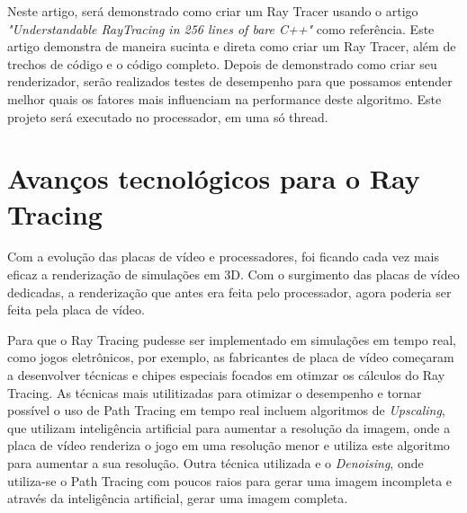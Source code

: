 \documentclass[journal]{IEEEtran}
\begin{document}
Neste artigo, será demonstrado como criar um Ray Tracer usando o artigo 
\emph{"Understandable RayTracing in 256 lines of bare C++"}\cite{c14} como referência.
Este artigo demonstra de maneira sucinta e direta como criar um Ray Tracer,
além de trechos de código e o código completo. Depois de demonstrado como
criar seu renderizador, serão realizados testes de desempenho para que
possamos entender melhor quais os fatores mais influenciam na performance
deste algoritmo. Este projeto será executado no processador, em uma
só thread.

\section{Avanços tecnológicos para o Ray Tracing}
Com a evolução das placas de vídeo e processadores, foi ficando cada vez mais
eficaz a renderização de simulações em 3D. Com o surgimento das placas de vídeo
dedicadas, a renderização que antes era feita pelo processador, agora poderia
ser feita pela placa de vídeo.

Para que o Ray Tracing pudesse ser implementado em simulações em tempo real,
como jogos eletrônicos, por exemplo, as fabricantes de placa de vídeo começaram
a desenvolver técnicas e chipes especiais focados em otimzar os cálculos do Ray 
Tracing. As técnicas mais utilitizadas para otimizar o desempenho e tornar possível
o uso de Path Tracing em tempo real incluem algoritmos de \emph{Upscaling}, que 
utilizam inteligência artificial para aumentar a resolução da imagem, onde a 
placa de vídeo renderiza o jogo em uma resolução menor e utiliza este algoritmo
para aumentar a sua resolução. Outra técnica utilizada e o \emph{Denoising},
onde utiliza-se o Path Tracing com poucos raios para gerar uma imagem incompleta
e através da inteligência artificial, gerar uma imagem completa.
\end{document}
